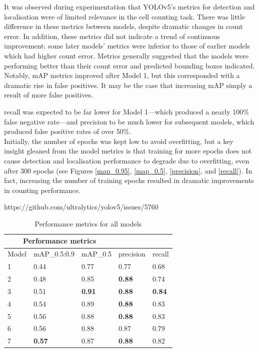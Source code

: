 It was observed during experimentation that YOLOv5's metrics for detection and localisation were of limited relevance in the cell counting task. There was little difference in these metrics between models, despite dramatic changes in count error. In addition, these metrics did not indicate a trend of continuous improvement: some later models' metrics were inferior to those of earlier models which had higher count error. Metrics generally suggested that the models were performing better than their count error and predicted bounding boxes indicated. Notably, mAP metrics improved after Model 1, but this corresponded with a dramatic rise in false positives. It may be the case that increasing mAP simply a result of more false positives.

recall was expected to be far lower for Model 1—which produced a nearly 100\% false negative rate—and precision to be much lower for subsequent models, which produced false positive rates of over 50\%.\\

Initially, the number of epochs was kept low to avoid overfitting, but a key insight gleaned from the model metrics is that training for more epochs does not cause detection and localisation performance to degrade due to overfitting, even after 300 epochs (see Figures \ref{map_0.95}, \ref{map_0.5}, \ref{precision}, and \ref{recall}). In fact, increasing the number of training epochs resulted in dramatic improvements in counting performance.

https://github.com/ultralytics/yolov5/issues/5760

\begin{table}
\centering
\begin{tabular}{ |l||l|l|l|l|  }
\hline
\multicolumn{3}{|c|}{Performance metrics} \\
\hline
Model & mAP\_0.5:0.9 & mAP\_0.5 & precision & recall \\
\hline
1 &      0.44 &   0.77 & 0.77 & 0.68\\
2 &      0.48 &  0.85 & \textbf{0.88} & 0.74 \\
3 &      0.51 &  \textbf{0.91} & \textbf{0.88} & \textbf{0.84} \\
4 &      0.54 & 0.89 & \textbf{0.88} & 0.83 \\
5 &      0.56 & 0.88 & \textbf{0.88} & 0.83 \\
6 &      0.56 & 0.88 & 0.87 & 0.79 \\
7 &      \textbf{0.57} & 0.87 & \textbf{0.88} & 0.82\\
\hline
\end{tabular}
\caption{Performance metrics for all models}
\label{metrics}
\end{table}

